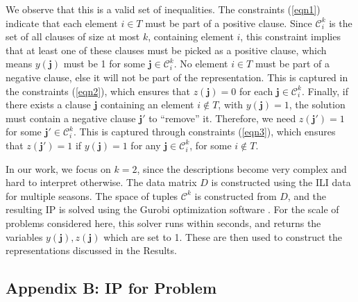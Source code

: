 We observe that this is a valid set of inequalities. The constraints (\ref{eqn1})
indicate that each element $i\in T$ must be part of a positive clause.
Since $\mathcal{C}^k_i$ is the set of all clauses of size at most $k$, containing
element $i$, this constraint implies that at least one of these clauses must be
picked as a positive clause, which means $y(\mathbf{j})$ must be 1 for some
$\mathbf{j}\in \mathcal{C}^k_i$.
No element $i\in T$ must be part of a negative
clause, else it will not be part of the representation. This is captured in
the constraints (\ref{eqn2}), which ensures that $z(\mathbf{j})=0$ for
each $\mathbf{j}\in \mathcal{C}^k_i$.
Finally, if there exists a clause $\mathbf{j}$ containing an element $i\not\in T$,
with $y(\mathbf{j})=1$, the solution must contain a negative clause $\mathbf{j'}$
to ``remove'' it. Therefore, we need $z(\mathbf{j'})=1$ for some
$\mathbf{j'}\in\mathcal{C}^k_i$. This is captured through constraints (\ref{eqn3}),
which ensures that $z(\mathbf{j'})=1$ if $y(\mathbf{j})=1$ for
any $\mathbf{j}\in \mathcal{C}^k_i$, for some $i\not\in T$.

In our work, we focus on $k=2$, since the descriptions become very complex and
hard to interpret otherwise. The data matrix $D$ is constructed using the ILI data
for multiple seasons. The space of tuples $\mathcal{C}^k$ is constructed from $D$,
and the resulting IP is solved using the Gurobi optimization software \cite{gurobi}.
For the scale of problems considered here, this solver runs within seconds, and
returns the variables $y(\mathbf{j}), z(\mathbf{j})$ which are set to 1.
These are then used to construct the representations discussed in the Results.

\subsection*{Appendix B: IP for \minapproxdesc{} Problem}

